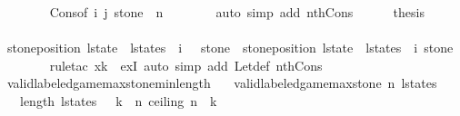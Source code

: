 \begin{isabellebody}
\ \ \ \ \ \ \isamarkupfalse%
\ Cons{\isacharparenleft}{}{\isacharparenright}{\isacharbrackleft}of\ {\isachardoublequoteopen}i{\isachardoublequoteclose}\ {\isachardoublequoteopen}j{\isacharminus}{}{\isachardoublequoteclose}{\isacharbrackright}\ {\isacharbackquoteopen}stone\ {\isacharless}\ n{\isacharbackquoteclose}\isanewline
\ \ \ \ \ \ \isamarkupfalse%
\ {\isacharparenleft}auto\ simp\ add{\isacharcolon}\ nth{\isacharunderscore}Cons{\isacharparenright}\isanewline
\ \ \ \ \isamarkupfalse%
\ {\isacharquery}thesis\isanewline
\ \ \ \ \ \ \isamarkupfalse%
\ {\isacartoucheopen}stone{\isacharunderscore}position\ {\isacharparenleft}{\isacharparenleft}l{\isacharunderscore}state\ {\isacharhash}\ l{\isacharunderscore}states{\isacharparenright}\ {\isacharbang}\ {\isacharparenleft}i\ {\isacharplus}\ {}{\isacharparenright}{\isacharparenright}\ stone\ {\isacharequal}\ stone{\isacharunderscore}position\ {\isacharparenleft}{\isacharparenleft}l{\isacharunderscore}state\ {\isacharhash}\ l{\isacharunderscore}states{\isacharparenright}\ {\isacharbang}\ i{\isacharparenright}\ stone{\isacartoucheclose}\isanewline
\ \ \ \ \ \ \isamarkupfalse%
\ {\isacharparenleft}rule{\isacharunderscore}tac\ x{\isacharequal}{\isachardoublequoteopen}k{\isacharplus}{}{\isachardoublequoteclose}\ \ exI{\isacharparenright}\ {\isacharparenleft}auto\ simp\ add{\isacharcolon}\ Let{\isacharunderscore}def\ nth{\isacharunderscore}Cons{\isacharparenright}\isanewline
\ \ \isamarkupfalse%
\isanewline
{}\isamarkupfalse%
%
\endisatagproof
{\isafoldproof}%
%
\isadelimproof
\isanewline
%
\endisadelimproof
\isanewline
{}\isamarkupfalse%
\ valid{\isacharunderscore}labeled{\isacharunderscore}game{\isacharunderscore}max{\isacharunderscore}stone{\isacharunderscore}min{\isacharunderscore}length{\isacharcolon}\isanewline
\ \ \ {\isachardoublequoteopen}valid{\isacharunderscore}labeled{\isacharunderscore}game{\isacharunderscore}max{\isacharunderscore}stone\ n\ l{\isacharunderscore}states{\isachardoublequoteclose}\isanewline
\ \ \ {\isachardoublequoteopen}length\ l{\isacharunderscore}states\ {\isasymge}\ {\isacharparenleft}{\isasymSum}\ k\ {\isasymleftarrow}\ {\isacharbrackleft}{}{\isachardot}{\isachardot}{\isacharless}n{\isacharplus}{}{\isacharbrackright}{\isachardot}\ {\isacharparenleft}ceiling\ {\isacharparenleft}n\ {\isacharslash}\ k{\isacharparenright}{\isacharparenright}{\isacharparenright}\ {\isacharplus}\ {}{\isachardoublequoteclose}\isanewline

\end{isabellebody}
